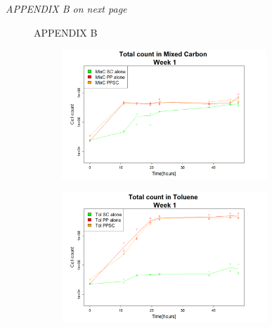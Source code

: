 \documentclass[a4paper, 10pt, conference]{ieeeconf}   %
\begin{document}
%
%

\vspace*{\fill}
\textit{APPENDIX B on next page}
\clearpage
{}
\begin{landscape}
	
	
	\begin{figure}
		APPENDIX B
		
		\flushleft
		\begin{subfigure}{.47\textheight}
			\centering
			
			\includegraphics[width=7.71cm]{totcount_mixC1.png}
			\caption{}
			
			\label{totcountmixC1}
		\end{subfigure}%
		\begin{subfigure}{.47\textheight}
			\centering
			
			\includegraphics[width=7.71cm]{totcount_tol1.png}
			\caption{}
			\label{totcounttol1}
		\end{subfigure}%
		\begin{subfigure}{.47\textheight}
			\centering
			

\end{subfigure}
\end{figure}
\end{landscape}
\end{document}
